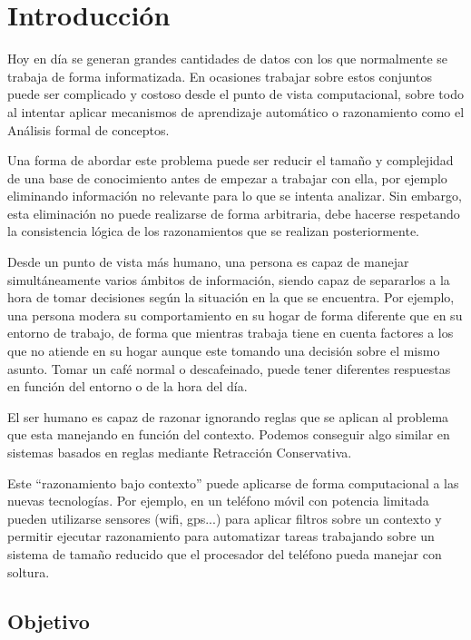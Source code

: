 
\chapter*{Introducción}


	Hoy en día se generan grandes cantidades de datos con los que normalmente se trabaja de forma informatizada. En ocasiones trabajar sobre estos conjuntos puede ser complicado y costoso desde el punto de vista computacional, sobre todo al intentar aplicar mecanismos de aprendizaje automático o razonamiento como el Análisis formal de conceptos.
	
	Una forma de abordar este problema puede ser reducir el tamaño y complejidad de una base 
	de conocimiento antes de empezar a trabajar con ella, por ejemplo eliminando información no 
	relevante para lo que se intenta analizar. Sin embargo, esta eliminación no puede realizarse de forma arbitraria, debe hacerse respetando la consistencia lógica de los razonamientos que se realizan posteriormente.    
	
	Desde un punto de vista más humano, una persona es capaz de manejar simultáneamente varios
	ámbitos de información, siendo capaz de separarlos a la hora de tomar decisiones según la 
	situación en la que se encuentra. Por ejemplo, una persona modera su comportamiento en su hogar
	de forma diferente que en su entorno de trabajo, de forma que mientras trabaja tiene en cuenta factores
	a los que no atiende en su hogar aunque este tomando una decisión sobre el mismo asunto. Tomar un café 
	normal o descafeinado, puede tener diferentes respuestas en función del entorno o de la hora del día.
	
	El ser humano es capaz de razonar ignorando reglas que se aplican al problema que esta manejando en función del contexto. Podemos conseguir
	algo similar en sistemas basados en reglas mediante Retracción Conservativa.
	
	Este ``razonamiento bajo contexto'' puede aplicarse de forma computacional a las nuevas tecnologías. Por ejemplo, en un teléfono móvil con potencia limitada pueden utilizarse sensores (wifi, gps...) para aplicar filtros sobre un contexto y permitir ejecutar razonamiento para automatizar tareas trabajando sobre un sistema de tamaño reducido que el procesador del teléfono pueda manejar con soltura.
	
 
\section*{Objetivo}

